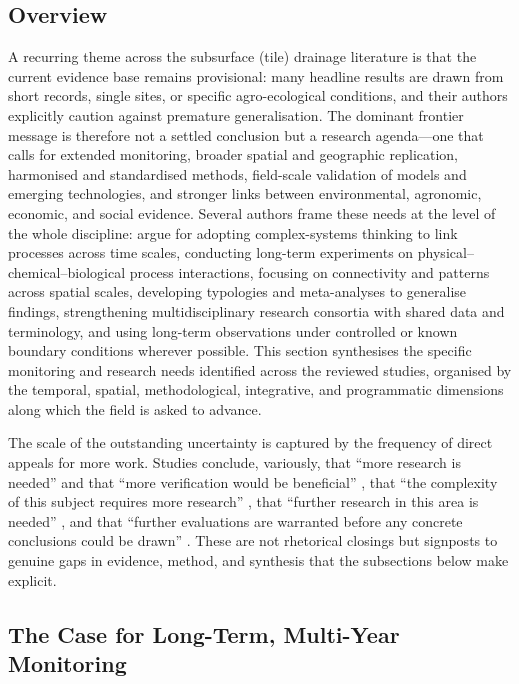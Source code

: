 \subsection{Overview}

A recurring theme across the subsurface (tile) drainage literature is that the current evidence base remains provisional: many headline results are drawn from short records, single sites, or specific agro-ecological conditions, and their authors explicitly caution against premature generalisation. The dominant frontier message is therefore not a settled conclusion but a research agenda---one that calls for extended monitoring, broader spatial and geographic replication, harmonised and standardised methods, field-scale validation of models and emerging technologies, and stronger links between environmental, agronomic, economic, and social evidence. Several authors frame these needs at the level of the whole discipline: \textcite{Rogger2017} argue for adopting complex-systems thinking to link processes across time scales, conducting long-term experiments on physical--chemical--biological process interactions, focusing on connectivity and patterns across spatial scales, developing typologies and meta-analyses to generalise findings, strengthening multidisciplinary research consortia with shared data and terminology, and using long-term observations under controlled or known boundary conditions wherever possible. This section synthesises the specific monitoring and research needs identified across the reviewed studies, organised by the temporal, spatial, methodological, integrative, and programmatic dimensions along which the field is asked to advance.

The scale of the outstanding uncertainty is captured by the frequency of direct appeals for more work. Studies conclude, variously, that ``more research is needed'' and that ``more verification would be beneficial'' \parencite{SHALIT1995}, that ``the complexity of this subject requires more research'' \parencite{Malone2014}, that ``further research in this area is needed'' \parencite{Woo2023}, and that ``further evaluations are warranted before any concrete conclusions could be drawn'' \parencite{GUPTA1993}. These are not rhetorical closings but signposts to genuine gaps in evidence, method, and synthesis that the subsections below make explicit.

\subsection{The Case for Long-Term, Multi-Year Monitoring}


